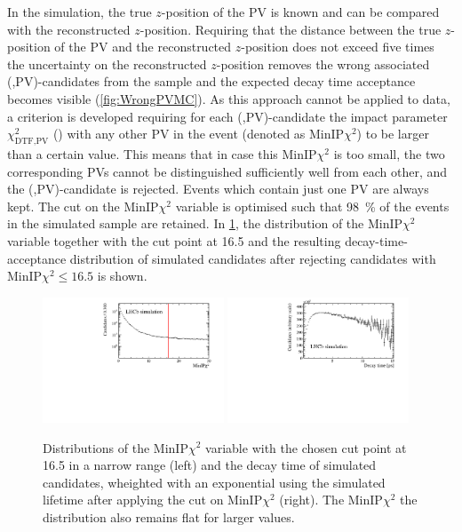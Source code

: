In the simulation, the true $z$-position of the \ac{PV} is known and can be compared with the reconstructed $z$-position.
Requiring that the distance between the true $z$-position of the \ac{PV} and the reconstructed $z$-position does not exceed five times the uncertainty on the reconstructed $z$-position removes the wrong associated (\Bz,\ac{PV})-candidates from the sample and the expected decay time acceptance becomes visible (\cref{fig:WrongPVMC}).
As this approach cannot be applied to data, a criterion is developed requiring for each (\Bz,\ac{PV})-candidate the impact parameter $\chi^2_{\text{DTF,PV}}$ (\chisqip) with any other \ac{PV} in the event (denoted as $\text{MinIP}\chi^2$) to be larger than a certain value.
This means that in case this $\text{MinIP}\chi^2$ is too small, the two corresponding \ac{PV}s cannot be distinguished sufficiently well from each other, and the (\Bz,\ac{PV})-candidate is rejected.
Events which contain just one \ac{PV} are always kept.
The cut on the $\text{MinIP}\chi^2$ variable is optimised such that \SI{98}{\percent} of the events in the simulated \BdToDpi sample are retained.
In \cref{fig:WrongPVData}, the distribution of the $\text{MinIP}\chi^2$ variable together with the cut point at \num{16.5} and the resulting decay-time-acceptance distribution of simulated candidates after rejecting candidates with $\text{MinIP}\chi^2\le\num{16.5}$ is shown.
\begin{figure}[tbp]
    \centering
    \includegraphics[width=0.48\textwidth]{07selection/figs/MinIPCHI2.pdf}
    \includegraphics[width=0.48\textwidth]{07selection/figs/WrongPVs-WeightingGoodData.pdf}
    \caption{Distributions of the $\text{MinIP}\chi^2$ variable with the chosen cut point at \num{16.5} in a narrow range (left) and the decay time of simulated \BdToDpi candidates, wheighted with an exponential using the simulated \Bz lifetime after applying the cut on $\text{MinIP}\chi^2$ (right). The $\text{MinIP}\chi^2$ the distribution also remains flat for larger values.}
    \label{fig:WrongPVData}
\end{figure}

